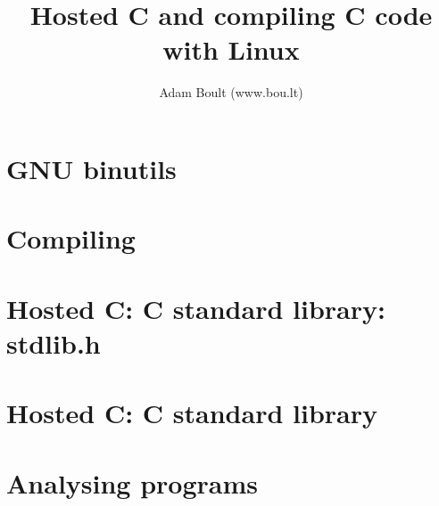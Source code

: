 \documentclass[oneside]{book}
\begin{document}
\author{Adam Boult (www.bou.lt)}
\title{Hosted C and compiling C code with Linux}
\maketitle

\setcounter{tocdepth}{0}
\tableofcontents



\part{GNU binutils}


\part{Compiling}




\part{Hosted C: C standard library: stdlib.h}






\part{Hosted C: C standard library}













\part{Analysing programs}



\end{document}
